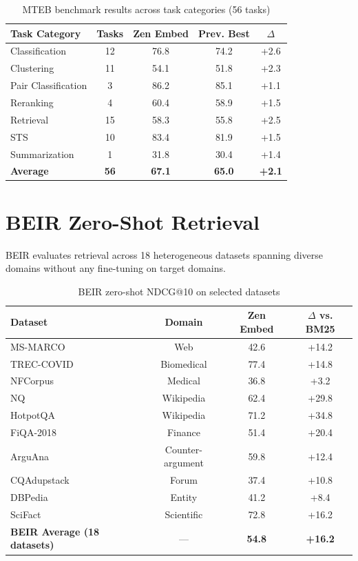 \documentclass[11pt,a4paper]{article}
\begin{document}
\begin{table}[H]
\centering
\caption{MTEB benchmark results across task categories (56 tasks)}
\label{tab:mteb}
\begin{tabular}{lcccc}
\toprule
Task Category & Tasks & Zen Embed & Prev. Best & $\Delta$ \\
\midrule
Classification & 12 & 76.8 & 74.2 & +2.6 \\
Clustering & 11 & 54.1 & 51.8 & +2.3 \\
Pair Classification & 3 & 86.2 & 85.1 & +1.1 \\
Reranking & 4 & 60.4 & 58.9 & +1.5 \\
Retrieval & 15 & 58.3 & 55.8 & +2.5 \\
STS & 10 & 83.4 & 81.9 & +1.5 \\
Summarization & 1 & 31.8 & 30.4 & +1.4 \\
\midrule
\textbf{Average} & \textbf{56} & \textbf{67.1} & \textbf{65.0} & \textbf{+2.1} \\
\bottomrule
\end{tabular}
\end{table}

\section{BEIR Zero-Shot Retrieval}

BEIR evaluates retrieval across 18 heterogeneous datasets spanning diverse domains without any fine-tuning on target domains.

\begin{table}[H]
\centering
\caption{BEIR zero-shot NDCG@10 on selected datasets}
\label{tab:beir}
\begin{tabular}{lccc}
\toprule
Dataset & Domain & Zen Embed & $\Delta$ vs. BM25 \\
\midrule
MS-MARCO & Web & 42.6 & +14.2 \\
TREC-COVID & Biomedical & 77.4 & +14.8 \\
NFCorpus & Medical & 36.8 & +3.2 \\
NQ & Wikipedia & 62.4 & +29.8 \\
HotpotQA & Wikipedia & 71.2 & +34.8 \\
FiQA-2018 & Finance & 51.4 & +20.4 \\
ArguAna & Counter-argument & 59.8 & +12.4 \\
CQAdupstack & Forum & 37.4 & +10.8 \\
DBPedia & Entity & 41.2 & +8.4 \\
SciFact & Scientific & 72.8 & +16.2 \\
\midrule
\textbf{BEIR Average (18 datasets)} & — & \textbf{54.8} & \textbf{+16.2} \\
\bottomrule
\end{tabular}
\end{table}
\end{document}
